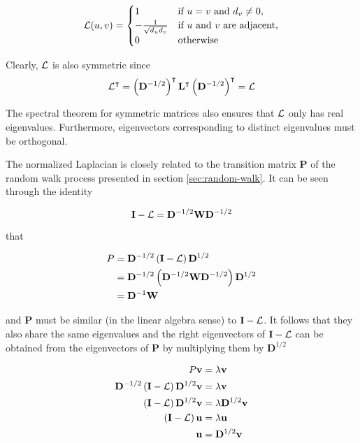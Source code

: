 \begin{align}
\mathbf{\mathcal{L}}(u,v) = 
\begin{cases}
1 & \text{if $u = v$ and $d_v \neq 0$,} \\
-\frac{1}{\sqrt{d_u d_v}} & \text{if $u$ and $v$ are adjacent,}\\
0 & \text{otherwise}
\end{cases}
\end{align}

Clearly, $\mathbf{\mathcal{L}}$ is also symmetric since
\begin{align}
\mathbf{\mathcal{L}}^\intercal = \left(\mathbf{D}^{-1/2} \right)^\intercal \mathbf{L}^\intercal \left( \mathbf{D}^{-1/2} \right)^\intercal = \mathbf{\mathcal{L}}
\end{align}

The spectral theorem for symmetric matrices \parencite{Watkins2010} also ensures that
$\mathbf{\mathcal{L}}$ only has real eigenvalues. Furthermore, eigenvectors corresponding to
distinct eigenvalues must be orthogonal.

The normalized Laplacian is closely related to the transition matrix $\mathbf{P}$ of the random
walk process presented in section \ref{sec:random-walk}. It can be seen through the
identity 

\begin{equation}
\mathbf{I} - \mathbf{\mathcal{L}} = \mathbf{D}^{-1/2} \mathbf{W} \mathbf{D}^{-1/2}
\end{equation}

that

\begin{align}
P &= \mathbf{D}^{-1/2} \left( \mathbf{I} - \mathbf{\mathcal{L}} \right) \mathbf{D}^{1/2} \label{eq:rw-similarity} \\
 &= \mathbf{D}^{-1/2} \left( \mathbf{D}^{-1/2} \mathbf{W} \mathbf{D}^{-1/2} \right) \mathbf{D}^{1/2} \notag \\
 &= \mathbf{D}^{-1} \mathbf{W} \notag
\end{align}

and $\mathbf{P}$ must be similar (in the
linear algebra sense) to $\mathbf{I} - \mathbf{\mathcal{L}}$. It follows that they also share
the same eigenvalues and the right eigenvectors of $\mathbf{I} -\mathbf{\mathcal{L}}$ can be
obtained from the eigenvectors of $\mathbf{P}$ by multiplying them by $\mathbf{D}^{1/2}$

\begin{align}
P\mathbf{v} &= \lambda \mathbf{v} \notag \\
\mathbf{D}^{-1/2} \left( \mathbf{I} - \mathbf{\mathcal{L}} \right) \mathbf{D}^{1/2} \mathbf{v}  &= \lambda \mathbf{v} \notag \\
\left( \mathbf{I} - \mathbf{\mathcal{L}} \right) \mathbf{D}^{1/2} \mathbf{v}  &= \lambda \mathbf{D}^{1/2} \mathbf{v} \notag \\
\left( \mathbf{I} - \mathbf{\mathcal{L}} \right) \mathbf{u} &= \lambda \mathbf{u} \\
\mathbf{u} &= \mathbf{D}^{1/2} \mathbf{v}
\label{eq:similarity-rw}
\end{align}

